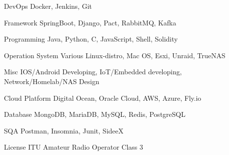 
\begin{multicols}{2}

\begin{cvskills}

  \cvskill
    {DevOps} %
    {Docker, Jenkins, Git} %

  \cvskill
    {Framework} %
    {SpringBoot, Django, Pact, RabbitMQ, Kafka} %

  \cvskill
    {Programming} %
    {Java, Python, C, JavaScript, Shell, Solidity} %


  \cvskill
    {Operation System} %
    {Various Linux-distro, Mac OS, Esxi, Unraid, TrueNAS} %

  \cvskill
    {Misc} %
    {IOS/Android Developing, IoT/Embedded developing, Network/Homelab/NAS Design} %



\end{cvskills}

\columnbreak

\begin{cvskills}

  \cvskill
    {Cloud Platform} %
    {Digital Ocean, Oracle Cloud, AWS, Azure, Fly.io} %

  \cvskill
    {Database} %
    {MongoDB, MariaDB, MySQL, Redis, PostgreSQL} %

  \cvskill
    {SQA} %
    {Postman, Insomnia, Junit, SideeX} %


  \cvskill
    {License} %
    {ITU Amateur Radio Operator Class 3} %



\end{cvskills}
\end{multicols}

